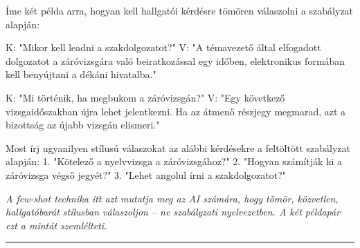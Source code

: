 \documentclass[11pt,a4paper]{article}
\begin{document}
\begin{prompt}
Íme két példa arra, hogyan kell hallgatói kérdésre tömören válaszolni
a szabályzat alapján:

K: "Mikor kell leadni a szakdolgozatot?"
V: "A témavezető által elfogadott dolgozatot a záróvizsgára való
    beiratkozással egy időben, elektronikus formában kell benyújtani
    a dékáni hivatalba."

K: "Mi történik, ha megbukom a záróvizsgán?"
V: "Egy következő vizsgaidőszakban újra lehet jelentkezni.
    Ha az átmenő részjegy megmarad, azt a bizottság az újabb vizsgán
    elismeri."

Most írj ugyanilyen stílusú válaszokat az alábbi kérdésekre
a feltöltött szabályzat alapján:
1. "Kötelező a nyelvvizsga a záróvizsgához?"
2. "Hogyan számítják ki a záróvizsga végső jegyét?"
3. "Lehet angolul írni a szakdolgozatot?"
\end{prompt}

\noindent\textit{A few-shot technika itt azt mutatja meg az AI számára,
hogy tömör, közvetlen, hallgatóbarát stílusban válaszoljon -- ne
szabályzati nyelvezetben. A két példapár ezt a mintát szemlélteti.}

\bigskip\noindent\rule{\linewidth}{0.4pt}\bigskip

%
\end{document}
